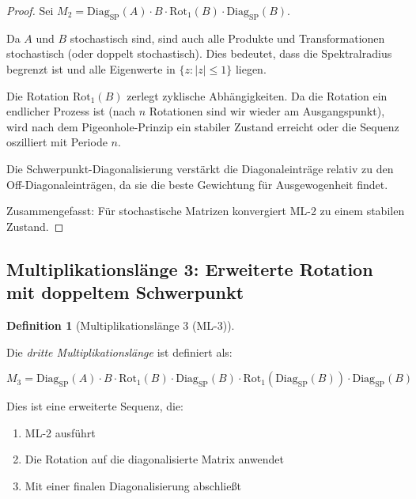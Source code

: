 \documentclass[a4paper,12pt]{article}
\theoremstyle{definition}
\newtheorem{definition}{Definition}
\begin{document}
\begin{proof}

Sei $M_2 = \text{Diag}_{\text{SP}}(A) \cdot B \cdot \text{Rot}_{1}(B) \cdot \text{Diag}_{\text{SP}}(B)$. 

Da $A$ und $B$ stochastisch sind, sind auch alle Produkte und Transformationen stochastisch (oder doppelt stochastisch). Dies bedeutet, dass die Spektralradius begrenzt ist und alle Eigenwerte in $\{z : |z| \leq 1\}$ liegen.

Die Rotation $\text{Rot}_1(B)$ zerlegt zyklische Abhängigkeiten. Da die Rotation ein endlicher Prozess ist (nach $n$ Rotationen sind wir wieder am Ausgangspunkt), wird nach dem Pigeonhole-Prinzip ein stabiler Zustand erreicht oder die Sequenz oszilliert mit Periode $n$.

Die Schwerpunkt-Diagonalisierung verstärkt die Diagonaleinträge relativ zu den Off-Diagonaleinträgen, da sie die beste Gewichtung für Ausgewogenheit findet.

Zusammengefasst: Für stochastische Matrizen konvergiert ML-2 zu einem stabilen Zustand.

\end{proof}

\subsection{Multiplikationslänge 3: Erweiterte Rotation mit doppeltem Schwerpunkt}

\begin{definition}[Multiplikationslänge 3 (ML-3)]
\label{def:ml3}

Die \emph{dritte Multiplikationslänge} ist definiert als:

\begin{equation}
M_3 = \text{Diag}_{\text{SP}}(A) \cdot B \cdot \text{Rot}_{1}(B) \cdot \text{Diag}_{\text{SP}}(B) \cdot \text{Rot}_{1}(\text{Diag}_{\text{SP}}(B)) \cdot \text{Diag}_{\text{SP}}(B)
\end{equation}

Dies ist eine erweiterte Sequenz, die:
\begin{enumerate}
\item ML-2 ausführt
\item Die Rotation auf die diagonalisierte Matrix anwendet
\item Mit einer finalen Diagonalisierung abschließt
\end{enumerate}

\end{definition}
\end{document}
